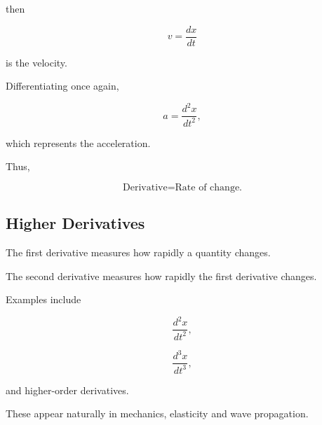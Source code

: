 then

\[
\boxed{
	v=\frac{dx}{dt}
}
\]

is the velocity.

Differentiating once again,

\[
\boxed{
	a=\frac{d^2x}{dt^2},
}
\]

which represents the acceleration.

Thus,

\[
\boxed{
	\text{Derivative}
	=
	\text{Rate of change.}
}
\]


\subsection{Higher Derivatives}

The first derivative measures how rapidly a quantity changes.

The second derivative measures how rapidly the first derivative changes.

Examples include

\[
\frac{d^2x}{dt^2},
\]

\[
\frac{d^3x}{dt^3},
\]

and higher-order derivatives.

These appear naturally in mechanics, elasticity and wave propagation.

